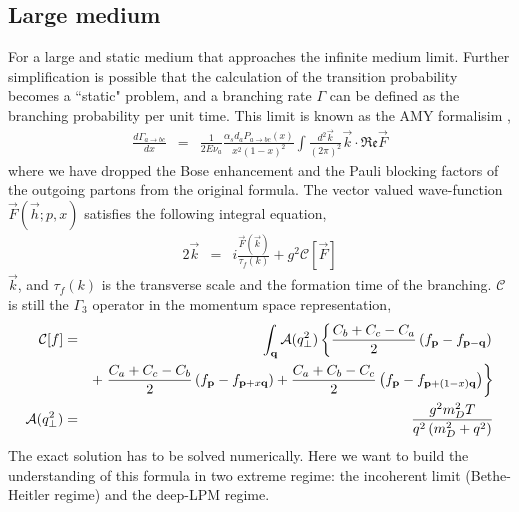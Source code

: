 \subsection{Large medium}
For a large and static medium that approaches the infinite medium limit. 
Further simplification is possible that the calculation of the transition probability becomes a ``static" problem, and a branching rate $\Gamma$ can be defined as the branching probability per unit time.
This limit is known as the AMY formalisim \cite{Arnold:2002ja,Arnold:2002zm,Arnold:2003zc},
\begin{eqnarray}\label{eq:AMY-1}
\nonumber
\frac{d\Gamma_{a\rightarrow bc}}{dx} &=& \frac{1}{2E\nu_a} \frac{\alpha_s d_a P_{a\rightarrow bc}(x)}{x^2(1-x)^2}\int\frac{d^2\vec{k}}{(2\pi)^2}\vec{k}\cdot \mathfrak{Re} \vec{F}
\end{eqnarray}
where we have dropped the Bose enhancement and the Pauli blocking factors of the outgoing partons from the original formula.
The vector valued wave-function $\vec{F}(\vec{h}; p, x)$ satisfies the following integral equation,
\begin{eqnarray}\label{eq:AMY-2}
\nonumber
2\vec{k} &=& i\frac{\vec{F}(\vec{k})}{\tau_f(k)}  + g^2 \mathcal{C}[\vec{F}]
\end{eqnarray} 
$\vec{k}$, and $\tau_f(k)$ is the transverse scale and the formation time of the branching. $\mathcal{C}$ is still the $\Gamma_3$ operator in the momentum space representation,
\begin{eqnarray}
\mathcal{C}[f] &=& \int_{\bf q} \mathcal{A}(q_\perp^2)
\left\{  \frac{C_b+C_c-C_a}{2}\left(f_{\bf p}-f_{{\bf p}-{\bf q}}\right) \right.\\\nonumber
&& + \left. \frac{C_a+C_c-C_b}{2}\left(f_{\bf p}-f_{{\bf p}+x{\bf q}}\right) + \frac{C_a+C_b-C_c}{2}\left(f_{\bf p}-f_{{\bf p}+(1-x){\bf q}}\right)\right\}\\
\mathcal{A}(q_\perp^2) &=& \frac{g^2 m_D^2 T}{q^2\left(m_D^2+q^2\right)}
\end{eqnarray}
The exact solution has to be solved numerically.
Here we want to build the understanding of this formula in two extreme regime: the incoherent limit (Bethe-Heitler regime) and the deep-LPM regime.

